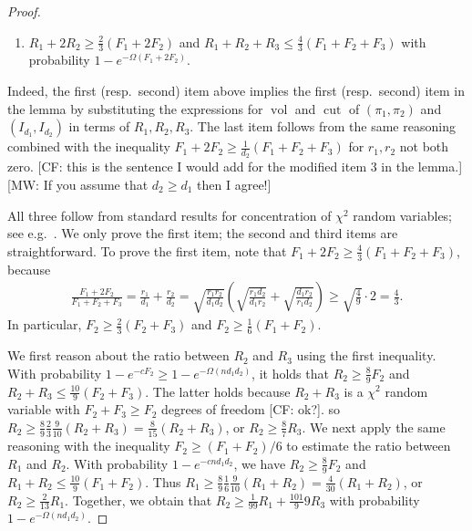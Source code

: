 \documentclass[aos]{imsart}
\theoremstyle{definition}
\numberwithin{equation}{section}
\DeclareMathOperator{\vol}{vol}
\DeclareMathOperator{\cut}{cut}
\newcommand{\CF}[1]{{\color{purple}[CF: #1]}}
\newcommand{\MW}[1]{{\color{red}[MW: #1]}}
\newcommand{\CF}[1]{{}}
\newcommand{\MW}[1]{{}}
\begin{document}
\begin{appendix}
\begin{proof}
\begin{enumerate}
\item $R_1 + 2 R_2 \geq \frac23 (F_1 + 2F_2)$ and $R_1 + R_2 + R_3 \leq \frac43 (F_1 + F_2 + F_3)$ with probability $1 - e^{- \Omega(F_1 + 2F_2)}$.
\end{enumerate}
Indeed, the first (resp.\ second) item above implies the first (resp.\ second) item in the lemma by substituting the expressions for $\vol$ and $\cut $ of $(\pi_1, \pi_2)$ and $(I_{d_1}, I_{d_2})$ in terms of $R_1, R_2, R_3$. The last item follows from the same reasoning combined with the inequality $F_1 + 2 F_2 \geq \frac{1}{d_2} (F_1 + F_2 + F_3)$ for $r_1, r_2$ not both zero. \CF{this is the sentence I would add for the modified item 3 in the lemma.} \MW{If you assume that $d_2 \geq d_1$ then I agree!}

All three follow from standard results for concentration of $\chi^2$ random variables; see e.g.~\cite{W19}.
We only prove the first item; the second and third items are straightforward.
To prove the first item, note that $F_1 + 2 F_2 \geq \frac43(F_1 + F_2 + F_3)$, because
\begin{align*}
  \frac{F_1 + 2 F_2}{F_1 + F_2 + F_3}
= \frac{r_1}{d_1} + \frac{r_2}{d_2}
= \sqrt{\frac{r_1r_2}{d_1d_2}} \left( \sqrt{\frac{r_1 d_2}{d_1 r_2}} + \sqrt{\frac{d_1 r_2}{r_1 d_2}} \right)
\geq \sqrt{\frac49} \cdot 2 = \frac43.
\end{align*}
In particular, $F_2 \geq \frac23(F_2 + F_3)$ and $F_2 \geq \frac16(F_1 + F_2)$. %

We first reason about the ratio between $R_2$ and $R_3$ using the first inequality.
With probability $1 - e^{- c F_2} \geq 1 - e^{- \Omega(n d_1 d_2)}$, it holds that $R_2 \geq \frac89 F_2$ and $R_2 + R_3 \leq \frac{10}9 (F _2 + F_3)$. The latter holds because $R_2 + R_3$ is a $\chi^2$ random variable with $F_2 + F_3 \geq F_2$ degrees of freedom \CF{ok?}. so $R_2 \geq \frac89 \frac23 \frac9{10} (R_2 + R_3) = \frac8{15} (R_2 + R_3)$, or $R_2 \geq \frac87 R_3$.
We next apply the same reasoning with the inequality $F_2 \geq (F_1 + F_2)/6$ to estimate the ratio between $R_1$ and $R_2$.
With probability $1 - e^{- c n d_1 d_2}$, we have $R_2 \geq \frac89 F_2$ and $R_1 + R_2 \leq \frac{10}9 (F_1 + F_2)$.
Thus $R_1 \geq \frac89 \frac16 \frac9{10} (R_1 + R_2) = \frac4{30} (R_1 + R_2)$, or $R_2 \geq \frac2{13} R_1$.
Together, we obtain that $R_2 \geq \frac1{99} R_1 + \frac{101}99 R_3$ with probability $1 - e^{-\Omega( n d_1 d_2)}$.
\end{proof}


\end{appendix}
\end{document}
